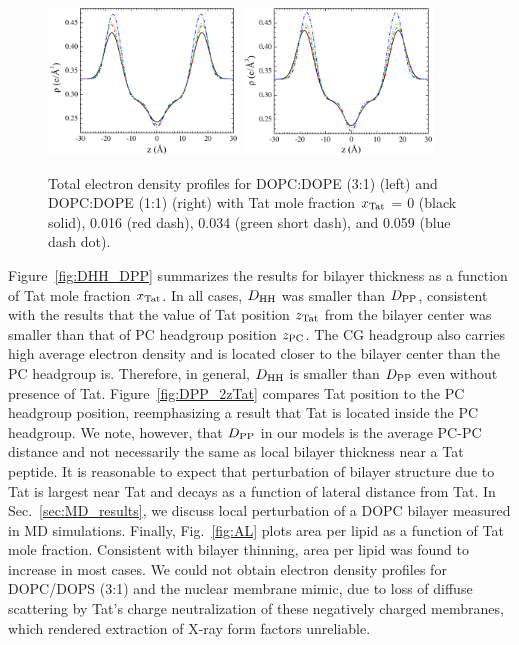 \begin{figure}[htbp]
  \centering
  \includegraphics[width=0.45\textwidth]{figures/Tat/SDP_Results/EDP/DOPCDOPE3to1_Tat_total_EDP}
  \qquad
  \includegraphics[width=0.45\textwidth]{figures/Tat/SDP_Results/EDP/DOPCDOPE1to1_Tat_total_EDP}
  \caption[]{Total electron density profiles for DOPC:DOPE (3:1) (left) and 
  DOPC:DOPE (1:1) (right) with Tat mole fraction $x_\textrm{Tat}$ = 0 (black solid),
  0.016 (red dash), 0.034 (green short dash), and 0.059 (blue dash dot).}
  \label{fig:DOPCDOPE_Tat_total_EDP}
\end{figure}

Figure~\ref{fig:DHH_DPP} summarizes the results for bilayer thickness as a function
of Tat mole fraction $x_\textrm{Tat}$. In all cases, $D_\textrm{HH}$ was smaller than $D_\textrm{PP}$, consistent
with the results that the value of Tat position $z_\textrm{Tat}$ from the bilayer center was smaller 
than that of PC headgroup position $z_\textrm{PC}$. The CG headgroup also carries 
high average electron density and is located closer to the bilayer center than
the PC headgroup is. Therefore, in general, $D_\textrm{HH}$ is smaller than $D_\textrm{PP}$ even
without presence of Tat. Figure~\ref{fig:DPP_2zTat} compares Tat position 
to the PC headgroup position, reemphasizing a result that Tat is located
inside the PC headgroup. We note, however, that $D_\textrm{PP}$ in our models is
the average PC-PC distance and not necessarily the same as local bilayer 
thickness near a Tat peptide. It is reasonable to expect that perturbation
of bilayer structure due to Tat is largest near Tat and decays as a
function of lateral distance from Tat. In Sec.~\ref{sec:MD_results}, we 
discuss local perturbation of a DOPC bilayer measured in MD simulations.
Finally, Fig.~\ref{fig:AL} plots area per lipid as a function of Tat mole
fraction. Consistent with bilayer thinning, area per lipid was found to 
increase in most cases. 
We could not obtain electron density profiles for DOPC/DOPS (3:1) and the nuclear membrane 
mimic, due to loss of diffuse scattering by Tat’s charge neutralization 
of these negatively charged membranes, which rendered extraction of 
X-ray form factors unreliable.


